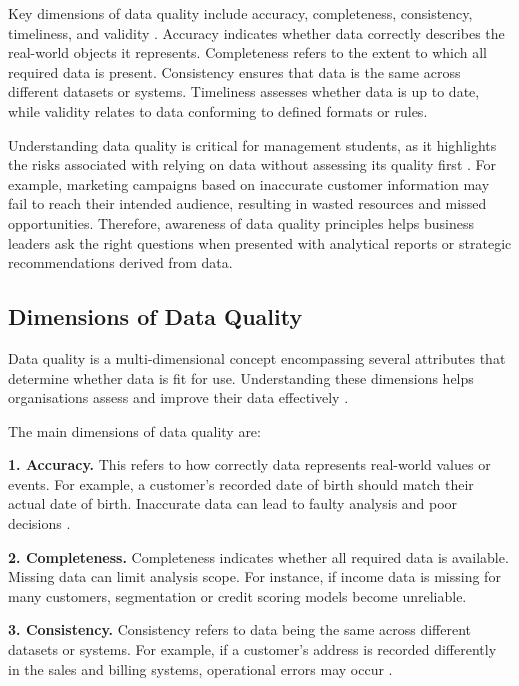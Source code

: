 Key dimensions of data quality include accuracy, completeness, consistency, timeliness, and validity \cite{pipino2002data}. Accuracy indicates whether data correctly describes the real-world objects it represents. Completeness refers to the extent to which all required data is present. Consistency ensures that data is the same across different datasets or systems. Timeliness assesses whether data is up to date, while validity relates to data conforming to defined formats or rules.

Understanding data quality is critical for management students, as it highlights the risks associated with relying on data without assessing its quality first \cite{strong1997data}. For example, marketing campaigns based on inaccurate customer information may fail to reach their intended audience, resulting in wasted resources and missed opportunities. Therefore, awareness of data quality principles helps business leaders ask the right questions when presented with analytical reports or strategic recommendations derived from data.

\subsection{Dimensions of Data Quality}

Data quality is a multi-dimensional concept encompassing several attributes that determine whether data is fit for use. Understanding these dimensions helps organisations assess and improve their data effectively \cite{lee2006data}.

The main dimensions of data quality are:

\textbf{1. Accuracy.} This refers to how correctly data represents real-world values or events. For example, a customer's recorded date of birth should match their actual date of birth. Inaccurate data can lead to faulty analysis and poor decisions \cite{batini2009methodologies}.

\textbf{2. Completeness.} Completeness indicates whether all required data is available. Missing data can limit analysis scope. For instance, if income data is missing for many customers, segmentation or credit scoring models become unreliable.

\textbf{3. Consistency.} Consistency refers to data being the same across different datasets or systems. For example, if a customer's address is recorded differently in the sales and billing systems, operational errors may occur \cite{madnick2009overview}.

